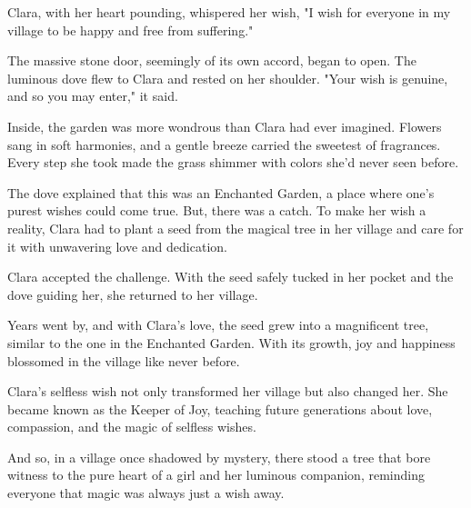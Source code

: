 \documentclass[10pt, a4paper, titlepage]{article}
\begin{document}
Clara, with her heart pounding, whispered her wish, "I wish for everyone in my village to be happy and free from suffering."

The massive stone door, seemingly of its own accord, began to open. The luminous dove flew to Clara and rested on her shoulder. "Your wish is genuine, and so you may enter," it said.

Inside, the garden was more wondrous than Clara had ever imagined. Flowers sang in soft harmonies, and a gentle breeze carried the sweetest of fragrances. Every step she took made the grass shimmer with colors she'd never seen before.

The dove explained that this was an Enchanted Garden, a place where one’s purest wishes could come true. But, there was a catch. To make her wish a reality, Clara had to plant a seed from the magical tree in her village and care for it with unwavering love and dedication.

Clara accepted the challenge. With the seed safely tucked in her pocket and the dove guiding her, she returned to her village.

Years went by, and with Clara's love, the seed grew into a magnificent tree, similar to the one in the Enchanted Garden. With its growth, joy and happiness blossomed in the village like never before.

Clara's selfless wish not only transformed her village but also changed her. She became known as the Keeper of Joy, teaching future generations about love, compassion, and the magic of selfless wishes.

And so, in a village once shadowed by mystery, there stood a tree that bore witness to the pure heart of a girl and her luminous companion, reminding everyone that magic was always just a wish away.
\end{document}
